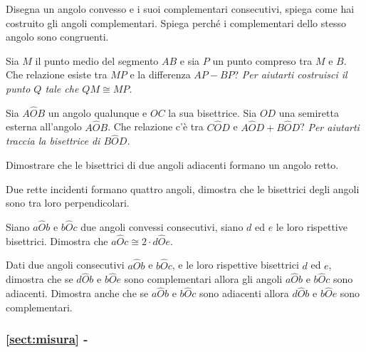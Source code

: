 \begin{multicols}{2}
\begin{esercizio}
Disegna un angolo convesso e i suoi complementari consecutivi, spiega 
come hai costruito gli angoli complementari. Spiega perché i 
complementari dello stesso angolo sono congruenti.
\end{esercizio}

\begin{esercizio}
Sia \(M\) il punto medio del segmento \(AB\) e sia \(P\) un punto compreso 
tra \(M\) e \(B\). Che relazione esiste tra \(MP\) e la differenza \(AP-BP\)? 
\emph{Per aiutarti costruisci il punto \(Q\) tale che \(QM\cong MP\).}
\end{esercizio}

\begin{esercizio}
Sia \(A\widehat{O}B\) un angolo qualunque e \(OC\) la sua bisettrice. Sia 
\(OD\) una semiretta esterna all'angolo \(A\widehat{O}B\). Che relazione 
c'è tra \(C\widehat{O}D\) e \(A\widehat{O}D+B\widehat{O}D\)? \emph{Per 
aiutarti traccia la bisettrice di \(B\widehat{O}D\).}
\end{esercizio}

\begin{esercizio}
Dimostrare che le bisettrici di due angoli adiacenti formano un 
angolo retto.
\end{esercizio}

\begin{esercizio}
Due rette incidenti formano quattro angoli, dimostra che le 
bisettrici degli angoli sono tra loro perpendicolari.
\end{esercizio}

\begin{esercizio}
Siano \(a\widehat{O}b\) e \(b\widehat{O}c\) due angoli convessi 
consecutivi, siano \(d\) ed \(e\) le loro rispettive bisettrici. Dimostra 
che \(a\widehat{O}c\cong 2\cdot d\widehat{O}e\).
\end{esercizio}

\begin{esercizio}
Dati due angoli consecutivi \(a\widehat{O}b\) e \(b\widehat{O}c\), e le 
loro rispettive bisettrici \(d\) ed \(e\), dimostra che se 
\(d\widehat{O}b\) e \(b\widehat{O}e\) sono complementari allora gli 
angoli \(a\widehat{O}b\) e \(b\widehat{O}c\) sono adiacenti. Dimostra 
anche che se \(a\widehat{O}b\) e \(b\widehat{O}c\) sono adiacenti allora  
\(d\widehat{O}b\) e \(b\widehat{O}e\) sono complementari.
\end{esercizio}

\begingroup
\hypersetup{linkcolor=black}
\subsubsection*{\ref{sect:misura} - }
\endgroup


\end{multicols}

